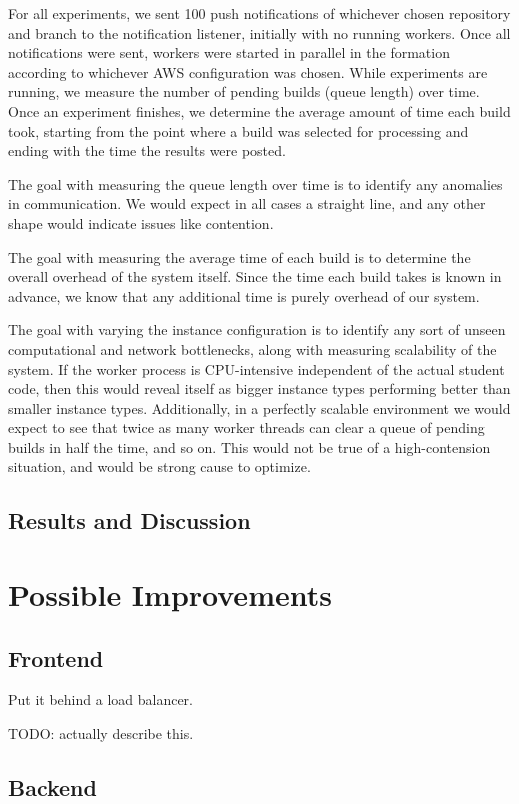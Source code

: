 \documentclass{scrartcl}
\begin{document}
For all experiments, we sent 100 push notifications of whichever chosen repository and branch to the notification listener, initially with no running workers.
Once all notifications were sent, workers were started in parallel in the formation according to whichever AWS configuration was chosen.
While experiments are running, we measure the number of pending builds (queue length) over time.
Once an experiment finishes, we determine the average amount of time each build took, starting from the point where a build was selected for processing and ending with the time the results were posted.

The goal with measuring the queue length over time is to identify any anomalies in communication.
We would expect in all cases a straight line, and any other shape would indicate issues like contention.

The goal with measuring the average time of each build is to determine the overall overhead of the system itself.
Since the time each build takes is known in advance, we know that any additional time is purely overhead of our system.

The goal with varying the instance configuration is to identify any sort of unseen computational and network bottlenecks, along with measuring scalability of the system.
If the worker process is CPU-intensive independent of the actual student code, then this would reveal itself as bigger instance types performing better than smaller instance types.
Additionally, in a perfectly scalable environment we would expect to see that twice as many worker threads can clear a queue of pending builds in half the time, and so on.
This would not be true of a high-contension situation, and would be strong cause to optimize.

\subsection{Results and Discussion}
\section{Possible Improvements}
\subsection{Frontend}
Put it behind a load balancer.

TODO: actually describe this.
\subsection{Backend}
\end{document}
